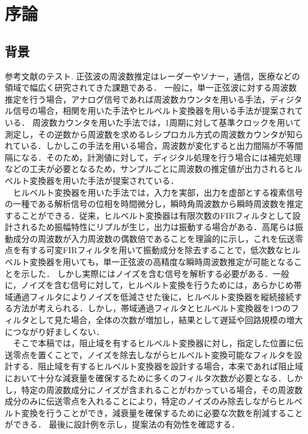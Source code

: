 \chapter{序論}

\section{背景}
参考文献のテスト\cite{樋口龍雄2000}.
正弦波の周波数推定はレーダーやソナー，通信，医療などの領域で幅広く研究されてきた課題である\cite{R.G.McKilliam,K.Wang,D.Rife}．
一般に，単一正弦波に対する周波数推定を行う場合，アナログ信号であれば周波数カウンタを用いる手法，ディジタル信号の場合，相関を用いた手法やヒルベルト変換器を用いる手法が提案されている．
周波数カウンタを用いた手法では，1周期に対して基準クロックを用いて測定し，その逆数から周波数を求めるレシプロカル方式の周波数カウンタが知られている．しかしこの手法を用いる場合，周波数が変化すると出力間隔が不等間隔になる．そのため，計測値に対して，ディジタル処理を行う場合には補完処理などの工夫が必要となるため，サンプルごとに周波数の推定値が出力されるヒルベルト変換器を用いた手法が提案されている．\\
　ヒルベルト変換器を用いた手法では，入力を実部，出力を虚部とする複素信号の一種である解析信号の位相を時間微分し，瞬時角周波数から瞬時周波数を推定することができる．従来，ヒルベルト変換器は有限次数のFIRフィルタとして設計されるため振幅特性にリプルが生じ，出力は振動する場合がある．高尾ら\cite{高尾可変なし,高尾可変あり}は振動成分の周波数が入力周波数の偶数倍であることを理論的に示し，これを伝送零点を有する可変FIRフィルタを用いて振動成分を除去することで，低次数なヒルベルト変換器を用いても，単一正弦波の高精度な瞬時周波数推定が可能となることを示した．
しかし実際にはノイズを含む信号を解析する必要がある．一般に，ノイズを含む信号に対して，ヒルベルト変換を行うためには，あらかじめ帯域通過フィルタによりノイズを低減させた後に，ヒルベルト変換器を縦続接続する方法が考えられる．しかし，帯域通過フィルタとヒルベルト変換器を1つのフィルタとして見た場合，全体の次数が増加し，結果として遅延や回路規模の増大につながり好ましくない．\\
　そこで本稿では，阻止域を有するヒルベルト変換器に対し，指定した位置に伝送零点を置くことで，ノイズを除去しながらヒルベルト変換可能なフィルタを設計する．阻止域を有するヒルベルト変換器を設計する場合，本来であれば阻止域において十分な減衰量を確保するために多くのフィルタ次数が必要となる．しかし，特定の周波数成分にノイズが含まれることがわかっている場合，その周波数成分のみに伝送零点を入れることにより，特定のノイズのみ除去しながらヒルベルト変換を行うことができ，減衰量を確保するために必要な次数を削減することができる．
最後に設計例を示し，提案法の有効性を確認する．
